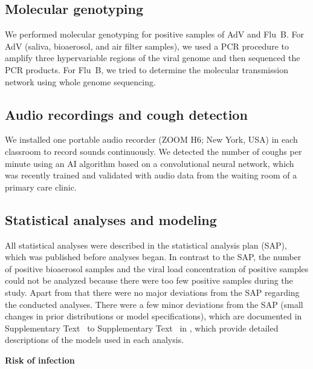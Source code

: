 \documentclass[fleqn,11pt]{wlscirep}
\begin{document}
\subsection{Molecular genotyping}

We performed molecular genotyping for positive samples of AdV and Flu~B. For AdV (saliva, bioaerosol, and air filter samples), we used a PCR procedure to amplify three hypervariable regions of the viral genome and then sequenced the PCR products\cite{Akello2020ClinicEpi,Akello2021SciRep}. For Flu~B, we tried to determine the molecular transmission network using whole genome sequencing\cite{Kelly2022FrontiersImmuno}.

\subsection{Audio recordings and cough detection}

We installed one portable audio recorder (ZOOM H6; New York, USA) in each classroom to record sounds continuously. We detected the number of coughs per minute using an AI algorithm based on a convolutional neural network\cite{Bertschinger2023IEEE}, which was recently trained and validated with audio data from the waiting room of a primary care clinic\cite{Zurcher2022}. 

\subsection{Statistical analyses and modeling}

All statistical analyses were described in the statistical analysis plan (SAP)\cite{Banholzer2023SAP}, which was published before analyses began. In contrast to the SAP, the number of positive bioaerosol samples and the viral load concentration of positive samples could not be analyzed because there were too few positive samples during the study. Apart from that there were no major deviations from the SAP regarding the conducted analyses. There were a few minor deviations from the SAP (\eg small changes in prior distributions or model specifications), which are documented in Supplementary Text~ to Supplementary Text~ in \supp, which provide detailed descriptions of the models used in each analysis.

\noindent\textbf{Risk of infection} \smallskip
\end{document}

